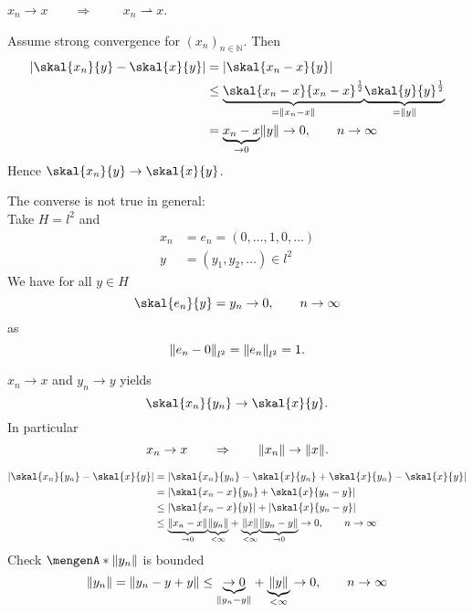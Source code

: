 \begin{satz}
	$x_n \to x$$ \qquad \Rightarrow \qquad $ $x_n \rightharpoonup x$.
\end{satz}

\begin{beweis}
	Assume strong convergence for $(x_n)_{n \in \mathbb{N}}$. Then
	\begin{align*}
		\abs{\skal{x_n}{y}- \skal{x}{y}} &= \abs{\skal{x_n-x}{y}} \\
		&\leq \underset{=\norm{x_n-x}}{\underbrace{\skal{x_n-x}{x_n-x}^{\frac{1}{2}}}} \underset{= \norm{y}}{\underbrace{\skal{y}{y}^{\frac{1}{2}}}} \\
		&= \underset{ \to 0}{\underbrace{x_n-x}} \norm{y} \to 0, \qquad n \to \infty
	\end{align*}
	Hence $\skal{x_n}{y} \to \skal{x}{y}$.
\end{beweis}

\begin{bemerkung}
	The converse is not true in general: \\
	Take $H=l^2$ and 
	\begin{align*}
		x_n &= e_n = (0, \dots,1,0,\dots) \\
		y &= (y_1,y_2,\dots) \in l^2 
	\end{align*}
	We have for all $y \in H$
	\[
		\skal{e_n}{y} = y_n \to 0, \qquad n \to \infty
	\]
	as
	\[
		\norm{e_n -0}_{l^2} = \norm{e_n}_{l^2} =1.
	\]
\end{bemerkung}

\begin{satz}
	$x_n \to x$ and $y_n \to y$ yields
	\[
		\skal{x_n}{y_n} \to \skal{x}{y}.
	\]
	In particular
	\[
		x_n \to x \qquad \Rightarrow \qquad \norm{x_n} \to \norm{x}.
	\]
\end{satz}
\begin{beweis}
	\begin{align*}
		\abs{\skal{x_n}{y_n}-\skal{x}{y}} &= \abs{\skal{x_n}{y_n}-\skal{x}{y_n} + \skal{x}{y_n} - \skal{x}{y}} \\
		&= \abs{\skal{x_n -x}{y_n} + \skal{x}{y_n-y}} \\
		&\leq \abs{\skal{x_n-x}{y}} + \abs{\skal{x}{y_n-y}} \\
		&\leq \underset{\to 0}{\underbrace{\norm{x_n-x}}} \underset{< \infty}{\underbrace{\norm{y_n}}} + \underset{< \infty}{\underbrace{\norm{x}}} \underset{\to 0}{\underbrace{\norm{y_n-y}}} \to 0, \qquad  n \to \infty
	\end{align*}
	Check $\set{\norm{y_n}}$ is bounded
	\[
		\norm{y_n} = \norm{y_n -y +y} \leq \underset{\norm{y_n -y}}{\underbrace{\to 0}}+ \underset{< \infty}{\underbrace{\norm{y}}} \to 0, \qquad n \to \infty
	\]
\end{beweis}

